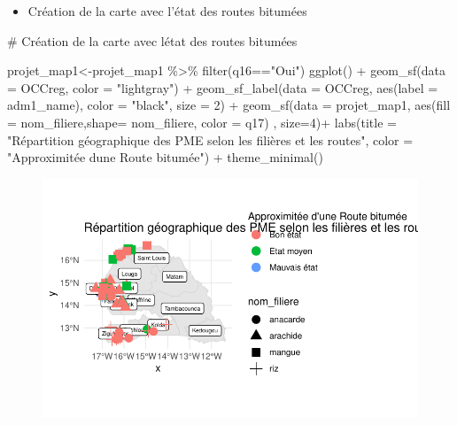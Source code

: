 \documentclass[
  letterpaper,
  DIV=11,
  numbers=noendperiod]{scrartcl}
\newenvironment{Shaded}{\begin{snugshade}}{\end{snugshade}}
\newcommand{\AttributeTok}[1]{\textcolor[rgb]{0.40,0.45,0.13}{#1}}
\newcommand{\CommentTok}[1]{\textcolor[rgb]{0.37,0.37,0.37}{#1}}
\newcommand{\DecValTok}[1]{\textcolor[rgb]{0.68,0.00,0.00}{#1}}
\newcommand{\FunctionTok}[1]{\textcolor[rgb]{0.28,0.35,0.67}{#1}}
\newcommand{\NormalTok}[1]{\textcolor[rgb]{0.00,0.23,0.31}{#1}}
\newcommand{\OtherTok}[1]{\textcolor[rgb]{0.00,0.23,0.31}{#1}}
\newcommand{\SpecialCharTok}[1]{\textcolor[rgb]{0.37,0.37,0.37}{#1}}
\newcommand{\StringTok}[1]{\textcolor[rgb]{0.13,0.47,0.30}{#1}}
\providecommand{\tightlist}{%
  \setlength{\itemsep}{0pt}\setlength{\parskip}{0pt}}\usepackage{longtable,booktabs,array}
\begin{document}
\begin{itemize}
\tightlist
\item
  Création de la carte avec l'état des routes bitumées
\end{itemize}

\begin{Shaded}
\begin{Highlighting}[]
\CommentTok{\# Création de la carte avec l\textquotesingle{}état des routes bitumées}

\NormalTok{projet\_map1}\OtherTok{\textless{}{-}}\NormalTok{projet\_map1 }\SpecialCharTok{\%\textgreater{}\%} \FunctionTok{filter}\NormalTok{(q16}\SpecialCharTok{==}\StringTok{"Oui"}\NormalTok{)}
\FunctionTok{ggplot}\NormalTok{() }\SpecialCharTok{+}
  \FunctionTok{geom\_sf}\NormalTok{(}\AttributeTok{data =}\NormalTok{ OCCreg, }\AttributeTok{color =} \StringTok{"lightgray"}\NormalTok{) }\SpecialCharTok{+}
  \FunctionTok{geom\_sf\_label}\NormalTok{(}\AttributeTok{data =}\NormalTok{ OCCreg, }\FunctionTok{aes}\NormalTok{(}\AttributeTok{label =}\NormalTok{ adm1\_name), }\AttributeTok{color =} \StringTok{"black"}\NormalTok{, }\AttributeTok{size =} \DecValTok{2}\NormalTok{) }\SpecialCharTok{+}
  \FunctionTok{geom\_sf}\NormalTok{(}\AttributeTok{data =}\NormalTok{ projet\_map1, }\FunctionTok{aes}\NormalTok{(}\AttributeTok{fill =}\NormalTok{ nom\_filiere,}\AttributeTok{shape=}\NormalTok{ nom\_filiere, }\AttributeTok{color =}\NormalTok{ q17) , }\AttributeTok{size=}\DecValTok{4}\NormalTok{)}\SpecialCharTok{+}
  \FunctionTok{labs}\NormalTok{(}\AttributeTok{title =} \StringTok{"Répartition géographique des PME selon les filières et les routes"}\NormalTok{,}
       \AttributeTok{color =} \StringTok{"Approximitée d\textquotesingle{}une Route bitumée"}\NormalTok{) }\SpecialCharTok{+}
  \FunctionTok{theme\_minimal}\NormalTok{() }
\end{Highlighting}
\end{Shaded}

\begin{figure}[H]

{\centering \includegraphics{projet_R_files/figure-pdf/unnamed-chunk-47-1.pdf}

}

\end{figure}
\end{document}
